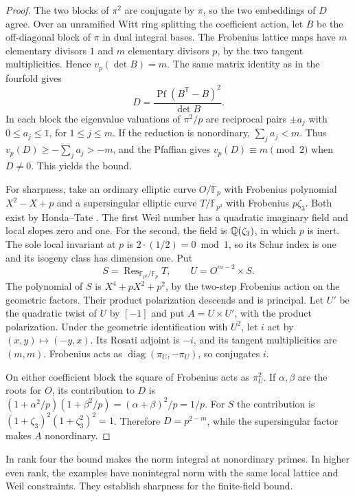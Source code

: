 \begin{proof}
The two blocks of \(\pi^2\) are conjugate by \(\pi\), so the two
embeddings of \(D\) agree. Over an unramified Witt ring splitting the
coefficient action, let \(B\) be the off-diagonal block of \(\pi\) in
dual integral bases. The Frobenius lattice maps have \(m\) elementary
divisors \(1\) and \(m\) elementary divisors \(p\), by the two tangent
multiplicities. Hence \(v_p(\det B)=m\). The same matrix identity as in
the fourfold gives
\[
 D=\frac{\operatorname{Pf}(B^{\mathsf T}-B)^2}{\det B}.
\]
In each block the eigenvalue valuations of \(\pi^2/p\) are reciprocal
pairs \(\pm a_j\) with \(0\le a_j\le1\), for \(1\le j\le m\).
If the reduction is nonordinary, \(\sum_j a_j<m\). Thus
\(v_p(D)\ge-\sum_j a_j>-m\), and the Pfaffian gives
\(v_p(D)\equiv m\pmod2\) when \(D\ne0\). This yields the bound.

For sharpness, take an ordinary elliptic curve \(O/\mathbb F_p\) with
Frobenius polynomial \(X^2-X+p\) and a supersingular elliptic curve
\(T/\mathbb F_{p^2}\) with Frobenius \(p\zeta_3\). Both exist by
Honda--Tate \cite[Theorem~1]{tate}. The first Weil number has a quadratic
imaginary field and local slopes zero and one. For the second, the
field is \(\mathbb Q(\zeta_3)\), in which \(p\) is inert. The sole local
invariant at \(p\) is \(2\cdot(1/2)=0\bmod1\), so its Schur index is
one and its isogeny class has dimension one. Put
\[
 S=\operatorname{Res}_{\mathbb F_{p^2}/\mathbb F_p} T,
 \qquad U=O^{m-2}\times S.
\]
The polynomial of \(S\) is \(X^4+pX^2+p^2\), by the two-step
Frobenius action on the geometric factors. Their product polarization
descends and is principal. Let \(U'\) be the quadratic twist of \(U\)
by \([-1]\) and put \(A=U\times U'\), with the product polarization.
Under the geometric identification with \(U^2\), let \(i\) act by
\((x,y)\mapsto(-y,x)\). Its Rosati adjoint is \(-i\), and its tangent
multiplicities are \((m,m)\). Frobenius acts as
\(\operatorname{diag}(\pi_U,-\pi_U)\), so conjugates \(i\).

On either coefficient block the square of Frobenius acts as
\(\pi_U^2\). If \(\alpha,\beta\) are the roots for \(O\), its
contribution to \(D\) is
\((1+\alpha^2/p)(1+\beta^2/p)=(\alpha+\beta)^2/p=1/p\).
For \(S\) the contribution is
\((1+\zeta_3)^2(1+\zeta_3^2)^2=1\). Therefore \(D=p^{2-m}\),
while the supersingular factor makes \(A\) nonordinary.
\end{proof}

In rank four the bound makes the norm integral at nonordinary primes.
In higher even rank, the examples have nonintegral norm with the same
local lattice and Weil constraints. They establish sharpness for the
finite-field bound.
